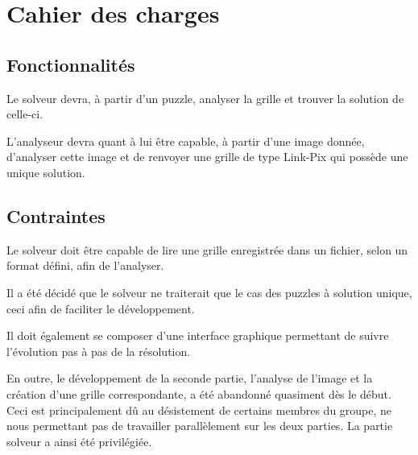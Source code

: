   \section{Cahier des charges}

  \subsection{Fonctionnalités}
Le solveur devra, à partir d'un puzzle, analyser la grille et trouver la solution de celle-ci.

L'analyseur devra quant à lui être capable, à partir d'une image donnée, d'analyser cette image et de renvoyer une grille de type Link-Pix qui possède une unique solution.

  \subsection{Contraintes}
  Le solveur doit être capable de lire une grille enregistrée dans un fichier, selon un format défini, afin de l'analyser.

  Il a été décidé que le solveur ne traiterait que le cas des puzzles à solution unique, ceci afin de faciliter le développement.

  Il doit également se composer d'une interface graphique permettant de suivre l'évolution pas à pas de la résolution.

  En outre, le développement de la seconde partie, l'analyse de l'image et la création d'une grille correspondante, a été abandonné quasiment dès le début. Ceci est principalement dû au désistement de certains membres du groupe, ne nous permettant pas de travailler parallèlement sur les deux parties. La partie solveur a ainsi été privilégiée.
